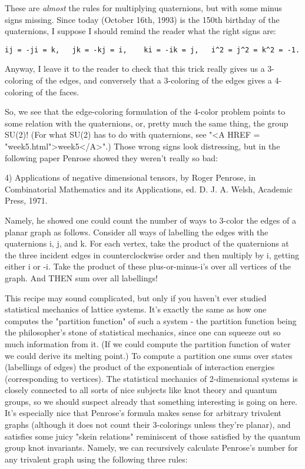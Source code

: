 These are \emph{almost} the rules for multiplying quaternions, but with some
minus signs missing.  Since today (October 16th, 1993) is the 150th
birthday of the quaternions, I suppose I should remind the reader what
the right signs are:

\begin{verbatim}
ij = -ji = k,	jk = -kj = i,    ki = -ik = j,   i^2 = j^2 = k^2 = -1.
\end{verbatim}
    

Anyway, I leave it to the reader to check that this
trick really gives us a 3-coloring of the edges, and conversely that a
3-coloring of the edges gives a 4-coloring of the faces.

So, we see that the edge-coloring formulation of the 4-color problem
points to some relation with the quaternions, or, pretty much the same
thing, the group SU(2)!  (For what SU(2) has to do with quaternions, see
"<A HREF = "week5.html">week5</A>".)  Those wrong signs look distressing, but in the following
paper Penrose showed they weren't really so bad:

4) Applications of negative dimensional tensors, by Roger Penrose, in
Combinatorial Mathematics and its Applications, ed. D. J. A. Welsh,
Academic Press, 1971.

Namely, he showed one could count the number of ways to 3-color the
edges of a planar graph as follows.  Consider all ways of labelling the
edges with the quaternions i, j, and k.  For each vertex, take the
product of the quaternions at the three incident edges in
counterclockwise order and then multiply by i, getting either i or -i.
Take the product of these plus-or-minus-i's over all vertices of the
graph.  And THEN sum over all labellings!

This recipe may sound complicated, but only if you haven't ever studied
statistical mechanics of lattice systems.  It's exactly the same as how
one computes the "partition function" of such a system - the partition
function being the philosopher's stone of statistical mechanics, since
one can squeeze out so much information from it.  (If we could compute
the partition function of water we could derive its melting point.)   To
compute a partition one sums over states (labellings of edges) the
product of the exponentials of interaction energies (corresponding to
vertices).  The statistical mechanics of 2-dimensional systems is
closely connected to all sorts of nice subjects like knot theory and
quantum groups, so we should suspect already that something
interesting is going on here.  It's especially nice that Penrose's
formula makes sense for arbitrary trivalent graphs (although it does not
count their 3-colorings unless they're planar), and satisfies some juicy
"skein relations" reminiscent of those satisfied by the quantum group
knot invariants.  Namely, we can recursively calculate Penrose's 
number for any trivalent graph using the following three rules:

